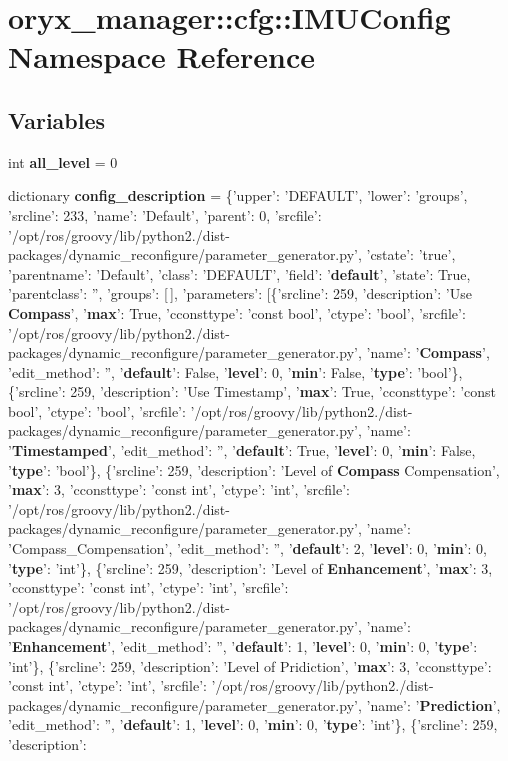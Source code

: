 \section{oryx\-\_\-manager\-:\-:cfg\-:\-:\-I\-M\-U\-Config \-Namespace \-Reference}
\label{namespaceoryx__manager_1_1cfg_1_1IMUConfig}
\subsection*{\-Variables}
\begin{DoxyCompactItemize}
\item 
int {\bf all\-\_\-level} = 0
\item 
dictionary {\bf config\-\_\-description} = \{'upper'\-: '\-D\-E\-F\-A\-U\-L\-T', 'lower'\-: 'groups', 'srcline'\-: 233, 'name'\-: '\-Default', 'parent'\-: 0, 'srcfile'\-: '/opt/ros/groovy/lib/python2./dist-\/packages/dynamic\-\_\-reconfigure/parameter\-\_\-generator.\-py', 'cstate'\-: 'true', 'parentname'\-: '\-Default', 'class'\-: '\-D\-E\-F\-A\-U\-L\-T', 'field'\-: '{\bf default}', 'state'\-: \-True, 'parentclass'\-: '', 'groups'\-: [$\,$], 'parameters'\-: [\{'srcline'\-: 259, 'description'\-: '\-Use {\bf \-Compass}', '{\bf max}'\-: \-True, 'cconsttype'\-: 'const bool', 'ctype'\-: 'bool', 'srcfile'\-: '/opt/ros/groovy/lib/python2./dist-\/packages/dynamic\-\_\-reconfigure/parameter\-\_\-generator.\-py', 'name'\-: '{\bf \-Compass}', 'edit\-\_\-method'\-: '', '{\bf default}'\-: \-False, '{\bf level}'\-: 0, '{\bf min}'\-: \-False, '{\bf type}'\-: 'bool'\}, \{'srcline'\-: 259, 'description'\-: '\-Use \-Timestamp', '{\bf max}'\-: \-True, 'cconsttype'\-: 'const bool', 'ctype'\-: 'bool', 'srcfile'\-: '/opt/ros/groovy/lib/python2./dist-\/packages/dynamic\-\_\-reconfigure/parameter\-\_\-generator.\-py', 'name'\-: '{\bf \-Timestamped}', 'edit\-\_\-method'\-: '', '{\bf default}'\-: \-True, '{\bf level}'\-: 0, '{\bf min}'\-: \-False, '{\bf type}'\-: 'bool'\}, \{'srcline'\-: 259, 'description'\-: '\-Level of {\bf \-Compass} \-Compensation', '{\bf max}'\-: 3, 'cconsttype'\-: 'const int', 'ctype'\-: 'int', 'srcfile'\-: '/opt/ros/groovy/lib/python2./dist-\/packages/dynamic\-\_\-reconfigure/parameter\-\_\-generator.\-py', 'name'\-: '\-Compass\-\_\-\-Compensation', 'edit\-\_\-method'\-: '', '{\bf default}'\-: 2, '{\bf level}'\-: 0, '{\bf min}'\-: 0, '{\bf type}'\-: 'int'\}, \{'srcline'\-: 259, 'description'\-: '\-Level of {\bf \-Enhancement}', '{\bf max}'\-: 3, 'cconsttype'\-: 'const int', 'ctype'\-: 'int', 'srcfile'\-: '/opt/ros/groovy/lib/python2./dist-\/packages/dynamic\-\_\-reconfigure/parameter\-\_\-generator.\-py', 'name'\-: '{\bf \-Enhancement}', 'edit\-\_\-method'\-: '', '{\bf default}'\-: 1, '{\bf level}'\-: 0, '{\bf min}'\-: 0, '{\bf type}'\-: 'int'\}, \{'srcline'\-: 259, 'description'\-: '\-Level of \-Pridiction', '{\bf max}'\-: 3, 'cconsttype'\-: 'const int', 'ctype'\-: 'int', 'srcfile'\-: '/opt/ros/groovy/lib/python2./dist-\/packages/dynamic\-\_\-reconfigure/parameter\-\_\-generator.\-py', 'name'\-: '{\bf \-Prediction}', 'edit\-\_\-method'\-: '', '{\bf default}'\-: 1, '{\bf level}'\-: 0, '{\bf min}'\-: 0, '{\bf type}'\-: 'int'\}, \{'srcline'\-: 259, 'description'\-: 
\end{DoxyCompactItemize}
